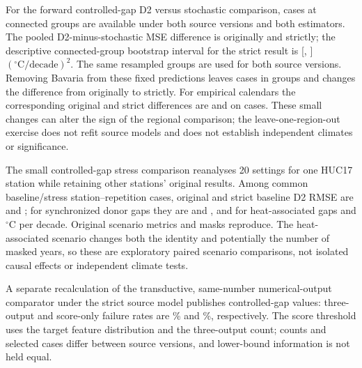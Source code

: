 For the forward controlled-gap D2 versus stochastic comparison, \SRRobustN{} cases at \SRRobustGroups{} connected groups are available under both source versions and both estimators. The pooled D2-minus-stochastic MSE difference is \SRRobustOld{} originally and \SRRobustNew{} strictly; the descriptive connected-group bootstrap interval for the strict result is [\SRRobustNewLo{}, \SRRobustNewHi{}] $({}^{\circ}\mathrm{C}/\mathrm{decade})^2$. The same resampled groups are used for both source versions. Removing Bavaria from these fixed predictions leaves \SRBayernCrossN{} cases in \SRBayernCrossGroups{} groups and changes the difference from \SRBayernCrossOld{} originally to \SRBayernCrossNew{} strictly. For empirical calendars the corresponding original and strict differences are \SRBayernCalendarOld{} and \SRBayernCalendarNew{} on \SRBayernCalendarN{} cases. These small changes can alter the sign of the regional comparison; the leave-one-region-out exercise does not refit source models and does not establish independent climates or significance.

The small controlled-gap stress comparison reanalyses 20 settings for one HUC17 station while retaining other stations' original results. Among \SRScenarioN{} common baseline/stress station--repetition cases, original and strict baseline D2 RMSE are \SRScenarioBaseOld{} and \SRScenarioBaseNew{}; for synchronized donor gaps they are \SRDonorOld{} and \SRDonorNew{}, and for heat-associated gaps \SRHeatOld{} and \SRHeatNew{} $^{\circ}$C per decade. Original scenario metrics and masks reproduce. The heat-associated scenario changes both the identity and potentially the number of masked years, so these are exploratory paired scenario comparisons, not isolated causal effects or independent climate tests.

A separate recalculation of the transductive, same-number numerical-output comparator under the strict source model publishes \SRMatchedN{} controlled-gap values: three-output and score-only failure rates are \SRMatchedThree\% and \SRMatchedScore\%, respectively. The score threshold uses the target feature distribution and the three-output count; counts and selected cases differ between source versions, and lower-bound information is not held equal.
